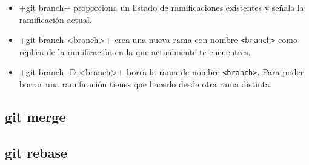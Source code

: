 \documentclass[a4paper,10pt]{article}
\begin{document}
      \begin{itemize}
       \item \cverb+git branch+ proporciona un listado de ramificaciones existentes y señala la ramificación actual.
       \item \cverb+git branch <branch>+ crea una nueva rama con nombre \verb+<branch>+ como réplica de la ramificación en la que actualmente te encuentres.
       \item \cverb+git branch -D <branch>+ borra la rama de nombre \verb+<branch>+. Para poder borrar una ramificación tienes que hacerlo desde otra rama distinta.
      \end{itemize}
      

    
    \subsection{git merge}
    
    \subsection{git rebase}


 
\end{document}

